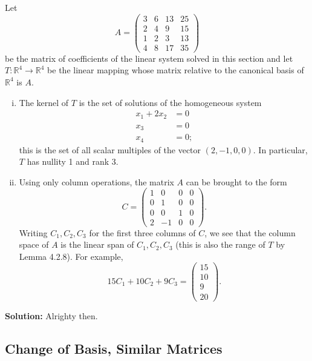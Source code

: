  
\begin{tcolorbox}[title=Exercise 3, breakable]
Let
\[
A = \begin{pmatrix} 3 & 6 & 13 & 25 \\ 2 & 4 & 9 & 15 \\ 1 & 2 & 3 & 13 \\ 4 & 8 & 17 & 35 \end{pmatrix}
\]
be the matrix of coefficients of the linear system solved in this section and let $T:\mathbb{R}^4 \to \mathbb{R}^4$ be the linear mapping whose matrix relative to the canonical basis of $\mathbb{R}^4$ is $A$.
\begin{enumerate}[(i)]
    \item The kernel of $T$ is the set of solutions of the homogeneous system
    \[
    \begin{aligned}
        x_1 + 2x_2 &= 0 \\
        x_3 &= 0 \\
        x_4 &= 0;
    \end{aligned}
    \]
    this is the set of all scalar multiples of the vector $(2, -1, 0, 0)$. In particular, $T$ has nullity 1 and rank 3.

    \item Using only column operations, the matrix $A$ can be brought to the form
    \[
    C = \begin{pmatrix} 1 & 0 & 0 & 0 \\ 0 & 1 & 0 & 0 \\ 0 & 0 & 1 & 0 \\ 2 & -1 & 0 & 0 \end{pmatrix}.
    \]
    Writing $C_1, C_2, C_3$ for the first three columns of $C$, we see that the column space of $A$ is the linear span of $C_1, C_2, C_3$ (this is also the range of $T$ by Lemma 4.2.8). For example,
    \[
    15C_1 + 10C_2 + 9C_3 = \begin{pmatrix} 15 \\ 10 \\ 9 \\ 20 \end{pmatrix}.
    \]
\end{enumerate}

\end{tcolorbox}

\textbf{Solution: } Alrighty then.

\subsection{Change of Basis, Similar Matrices}


